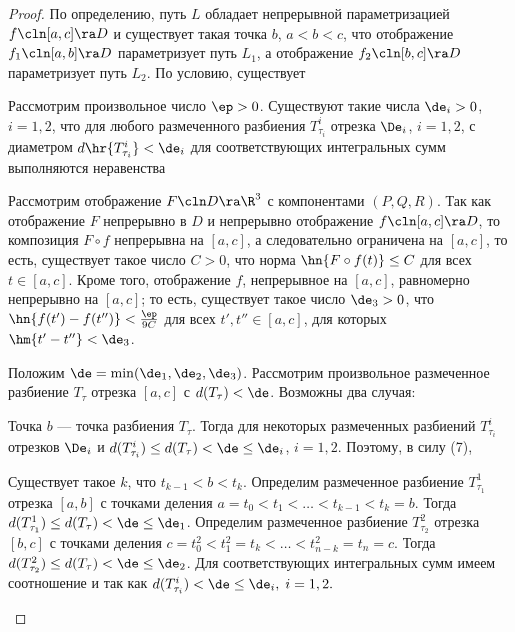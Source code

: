 \documentclass[a4paper]{article}
\begin{document}
\begin{proof}
По определению, путь $L$ обладает непрерывной параметризацией
$f\cln[a,c]\ra D$ и существует такая точка $b$, $a<b<c$, что
отображение $f_1\cln[a,b]\ra D$ параметризует путь $L_1$, а
отображение $f_2\cln[b,c]\ra D$ параметризует путь $L_2$. По
условию, существует 

Рассмотрим произвольное число $\ep>0$. Существуют такие числа
$\de_i>0$, $i=1,2$, что для любого размеченного разбиения
$T^i_{\tau_i}$ отрезка $\De_i$, $i=1,2$, с диаметром
$d\hr{T^i_{\tau_i}}<\de_i$ для соответствующих интегральных сумм
выполняются неравенства 

Рассмотрим отображение $F\cln D\ra\R^3$ с компонентами $(P,Q,R)$.
Так как отображение $F$ непрерывно в $D$ и непрерывно отображение
$f\cln[a,c]\ra D$, то композиция $F\circ f$ непрерывна на $[a,c]$, а
следовательно ограничена на $[a,c]$, то есть, существует такое число
$C>0$, что норма $\hn{F\circ f(t)}\le C$ для всех $t\in[a,c]$. Кроме
того, отображение $f$, непрерывное на $[a,c]$, равномерно непрерывно
на $[a,c]$; то есть, существует такое число $\de_3>0$, что
$\hn{f(t')-f(t'')} < \frac{\ep}{9C}$ для всех $t',t''\in[a,c]$, для
которых $\hm{t'-t''}<\de_3$.

Положим $\de=\min(\de_1,\de_2,\de_3)$. Рассмотрим произвольное
размеченное разбиение $T_{\tau}$ отрезка $[a,c]$ с
$d(T_{\tau})<\de$. Возможны два случая:

\begin{points}{-2}
\item Точка $b$ --- точка разбиения $T_{\tau}$. Тогда
 для некоторых размеченных разбиений
$T^i_{\tau_i}$ отрезков $\De_i$ и $d(T^i_{\tau_i})\le d(T_{\tau}) <
\de \le\de_i$, $i=1,2$. Поэтому, в силу (7),

\item Существует такое $k$, что $t_{k-1}<b<t_k$. Определим
размеченное разбиение $T^1_{\tau_1}$ отрезка $[a,b]$ с точками
деления $a=t_0<t_1<\ldots <t_{k-1}<t_k=b$. Тогда $d(T^1_{\tau_1})\le
d(T_{\tau})<\de\le\de_1$. Определим размеченное разбиение
$T^2_{\tau_2}$ отрезка $[b,c]$ с точками деления
$c=t_0^2<t_1^2=t_k<\ldots<t^2_{n-k}=t_n=c$. Тогда
$d(T^2_{\tau_2})\le d(T_{\tau}) < \de \le \de_2$. Для
соответствующих интегральных сумм имеем соотношение
 и
 так как $d(T^i_{\tau_i})<\de\le\de_i, \; i=1,2.$
\end{points}


\end{proof}
\end{document}
